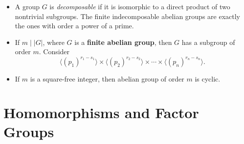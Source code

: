 \documentclass{article}
\begin{document}
\begin{itemize}
    \item A group $G$ is \textit{decomposable} if it is isomorphic to a direct product of two nontrivial subgroups. The finite indecomposable abelian groups are exactly the ones with order a power of a prime.
    \item If $m \mid |G|$, where $G$ is a \textbf{finite abelian group}, then $G$ has a subgroup of order $m$. Consider $$\langle (p_1)^{r_1 - s_1} \rangle \times \langle (p_2)^{r_2 - s_2} \rangle \times \cdots \times \langle (p_n)^{r_n - s_n} \rangle.$$
    \item If $m$ is a square-free integer, then abelian group of order $m$ is cyclic.
\end{itemize}

\section{Homomorphisms and Factor Groups}
\end{document}
